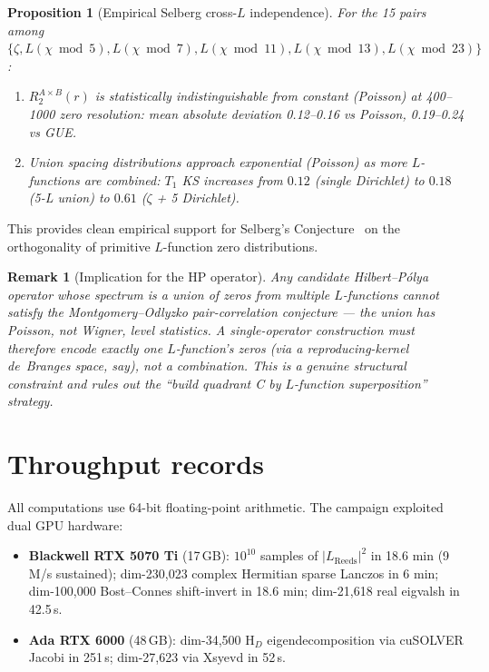 \documentclass[11pt,a4paper]{article}
\newtheorem{proposition}{Proposition}
\newtheorem{remark}{Remark}
\begin{document}
\begin{proposition}[Empirical Selberg cross-$L$ independence]
\label{prop:selberg}
For the 15 pairs among $\{\zeta, L(\chi\bmod 5), L(\chi\bmod 7),
L(\chi\bmod 11), L(\chi\bmod 13), L(\chi\bmod 23)\}$:
\begin{enumerate}[nosep]
\item $R_2^{A\times B}(r)$ is statistically indistinguishable from
      constant (Poisson) at 400--1000 zero resolution: mean absolute
      deviation 0.12--0.16 vs Poisson, 0.19--0.24 vs GUE.
\item Union spacing distributions approach exponential (Poisson) as
      more $L$-functions are combined: $T_1$ KS increases from $0.12$
      (single Dirichlet) to $0.18$ (5-L union) to $0.61$
      ($\zeta$ + 5 Dirichlet).
\end{enumerate}
\end{proposition}

This provides clean empirical support for Selberg's
Conjecture~\cite{selberg1992} on the orthogonality of primitive
$L$-function zero distributions.

\begin{remark}[Implication for the HP operator]
Any candidate Hilbert--P\'olya operator whose spectrum is a union
of zeros from multiple $L$-functions cannot satisfy the
Montgomery--Odlyzko pair-correlation conjecture --- the union has
Poisson, not Wigner, level statistics. A single-operator construction
must therefore encode exactly \emph{one} $L$-function's zeros (via
a reproducing-kernel de~Branges space, say), not a combination.
This is a genuine structural constraint and rules out the
``build quadrant C by $L$-function superposition'' strategy.
\end{remark}

\section{Throughput records}\label{sec:throughput}

All computations use 64-bit floating-point arithmetic. The campaign
exploited dual GPU hardware:

\begin{itemize}[nosep]
\item \textbf{Blackwell RTX 5070 Ti} (17\,GB): $10^{10}$ samples of
      $|L_\text{Reeds}|^2$ in 18.6 min (9 M/s sustained); dim-230{,}023
      complex Hermitian sparse Lanczos in 6 min; dim-100{,}000
      Bost--Connes shift-invert in 18.6 min; dim-21{,}618 real
      eigvalsh in 42.5\,s.
\item \textbf{Ada RTX 6000} (48\,GB): dim-34{,}500 H$_D$ eigendecomposition
      via cuSOLVER Jacobi in 251\,s; dim-27{,}623 via Xsyevd in 52\,s.
\end{itemize}
\end{document}
